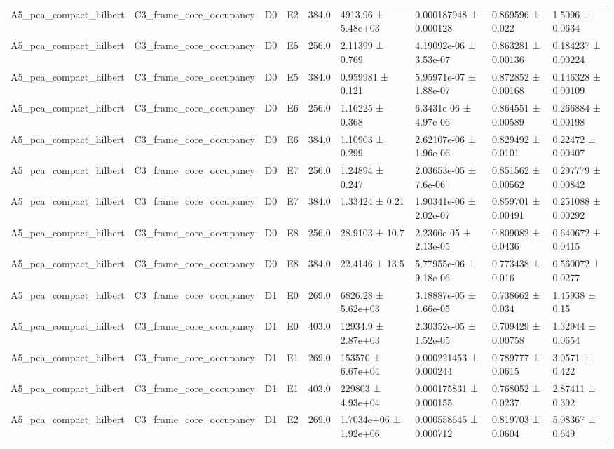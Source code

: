 \begin{table}
\begin{tabular}{lllllllll}
A5\_pca\_compact\_hilbert & C3\_frame\_core\_occupancy & D0 & E2 & 384.0 & 4913.96 ± 5.48e+03 & 0.000187948 ± 0.000128 & 0.869596 ± 0.022 & 1.5096 ± 0.0634 \\
A5\_pca\_compact\_hilbert & C3\_frame\_core\_occupancy & D0 & E5 & 256.0 & 2.11399 ± 0.769 & 4.19092e-06 ± 3.53e-07 & 0.863281 ± 0.00136 & 0.184237 ± 0.00224 \\
A5\_pca\_compact\_hilbert & C3\_frame\_core\_occupancy & D0 & E5 & 384.0 & 0.959981 ± 0.121 & 5.95971e-07 ± 1.88e-07 & 0.872852 ± 0.00168 & 0.146328 ± 0.00109 \\
A5\_pca\_compact\_hilbert & C3\_frame\_core\_occupancy & D0 & E6 & 256.0 & 1.16225 ± 0.368 & 6.3431e-06 ± 4.97e-06 & 0.864551 ± 0.00589 & 0.266884 ± 0.00198 \\
A5\_pca\_compact\_hilbert & C3\_frame\_core\_occupancy & D0 & E6 & 384.0 & 1.10903 ± 0.299 & 2.62107e-06 ± 1.96e-06 & 0.829492 ± 0.0101 & 0.22472 ± 0.00407 \\
A5\_pca\_compact\_hilbert & C3\_frame\_core\_occupancy & D0 & E7 & 256.0 & 1.24894 ± 0.247 & 2.03653e-05 ± 7.6e-06 & 0.851562 ± 0.00562 & 0.297779 ± 0.00842 \\
A5\_pca\_compact\_hilbert & C3\_frame\_core\_occupancy & D0 & E7 & 384.0 & 1.33424 ± 0.21 & 1.90341e-06 ± 2.02e-07 & 0.859701 ± 0.00491 & 0.251088 ± 0.00292 \\
A5\_pca\_compact\_hilbert & C3\_frame\_core\_occupancy & D0 & E8 & 256.0 & 28.9103 ± 10.7 & 2.2366e-05 ± 2.13e-05 & 0.809082 ± 0.0436 & 0.640672 ± 0.0415 \\
A5\_pca\_compact\_hilbert & C3\_frame\_core\_occupancy & D0 & E8 & 384.0 & 22.4146 ± 13.5 & 5.77955e-06 ± 9.18e-06 & 0.773438 ± 0.016 & 0.560072 ± 0.0277 \\
A5\_pca\_compact\_hilbert & C3\_frame\_core\_occupancy & D1 & E0 & 269.0 & 6826.28 ± 5.62e+03 & 3.18887e-05 ± 1.66e-05 & 0.738662 ± 0.034 & 1.45938 ± 0.15 \\
A5\_pca\_compact\_hilbert & C3\_frame\_core\_occupancy & D1 & E0 & 403.0 & 12934.9 ± 2.87e+03 & 2.30352e-05 ± 1.52e-05 & 0.709429 ± 0.00758 & 1.32944 ± 0.0654 \\
A5\_pca\_compact\_hilbert & C3\_frame\_core\_occupancy & D1 & E1 & 269.0 & 153570 ± 6.67e+04 & 0.000221453 ± 0.000244 & 0.789777 ± 0.0615 & 3.0571 ± 0.422 \\
A5\_pca\_compact\_hilbert & C3\_frame\_core\_occupancy & D1 & E1 & 403.0 & 229803 ± 4.93e+04 & 0.000175831 ± 0.000155 & 0.768052 ± 0.0237 & 2.87411 ± 0.392 \\
A5\_pca\_compact\_hilbert & C3\_frame\_core\_occupancy & D1 & E2 & 269.0 & 1.7034e+06 ± 1.92e+06 & 0.000558645 ± 0.000712 & 0.819703 ± 0.0604 & 5.08367 ± 0.649 \\

\end{tabular}
\end{table}
